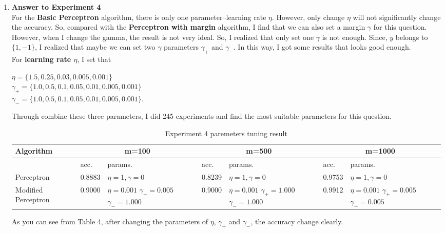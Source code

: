 \begin{enumerate}
\item {\bf Answer to Experiment 4}\\

For the {\bf Basic Perceptron} algorithm, there is only one parameter--learning rate $\eta$. However, only change $\eta$ will not significantly change the accuracy. So, compared with the {\bf Perceptron with margin} algorithm,  I find that we can also set a margin $\gamma$ for this question. However, when I change the gamma, the result is not very ideal. So, I realized that only set one $\gamma$ is not enough. Since, $y$ belongs to $\{1, -1\}$, I realized that maybe we can set two $\gamma$ parameters $\gamma_+$ and $\gamma_-$. In this way, I got some results that looks good enough. \\

For {\bf learning rate $\eta$}, I set that
\begin{center}
$\eta = \{1.5, 0.25, 0.03, 0.005, 0.001 \}$\\
$\gamma_+ = \{1.0, 0.5, 0.1, 0.05, 0.01, 0.005, 0.001 \}$\\
$\gamma_- = \{1.0, 0.5, 0.1, 0.05, 0.01, 0.005, 0.001 \}$.
\end{center}
 Through combine these three parameters, I did 245 experiments and find the most suitable parameters for this question.
 
\begin{table}[H]
\caption {Experiment 4 paremeters tuning result} \label{tab:title} 
    \begin{center}
  \begin{tabular}{|p{3.8cm}|l|p{2.2cm}|l|p{2.2cm}|l|p{2.2cm}|}
\hline
 Algorithm &  \multicolumn{2}{c|}{m=100} & \multicolumn{2}{c|}{m=500} & \multicolumn{2}{c|}{m=1000}\\\hline\hline
 & acc. & params. & acc. & params. & acc. & params.\\\hline
 Perceptron          & 0.8883 & $\eta=1, \gamma=0$ &  0.8239 & $\eta=1, \gamma=0$ & 0.9753 & $\eta=1, \gamma=0$\\\hline
 Modified Perceptron & 0.9000 & $\eta=0.001$ $\gamma_+=0.005$ $\gamma_-=1.000$ & 0.9000 & $\eta=0.001$ $\gamma_+=1.000$ $\gamma_-=1.000$ & 0.9912 & $\eta=0.001$ $\gamma_+=0.005$ $\gamma_-=0.005$ \\\hline
\end{tabular}
\end{center}
\end{table}

As you can see from Table 4, after changing the parameters of $\eta$, $\gamma_+$ and $\gamma_-$, the accuracy change clearly.\\

\end{enumerate}



